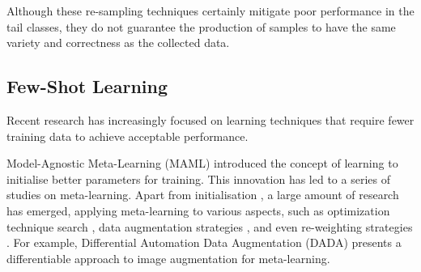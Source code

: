 
Although these re-sampling techniques certainly mitigate poor performance in the tail classes, they do not guarantee the production of samples to have the same variety and correctness as the collected data.

\subsection{Few-Shot Learning}
Recent research has increasingly focused on learning techniques that require fewer training data to achieve acceptable performance.

Model-Agnostic Meta-Learning (MAML) \parencite{finn2017model} introduced the concept of learning to initialise better parameters for training. This innovation has led to a series of studies on meta-learning. Apart from initialisation \parencite{nichol2018first, 2018Reptile}, a large amount of research has emerged, applying meta-learning to various aspects, such as optimization technique search \parencite{andrychowicz2016learning}, data augmentation strategies \parencite{li2020dada, galashov2022data, cubuk2018autoaugment}, and even re-weighting strategies \parencite{shu2019meta}. For example, Differential Automation Data Augmentation (DADA) \parencite{li2020dada} presents a differentiable approach to image augmentation for meta-learning.


